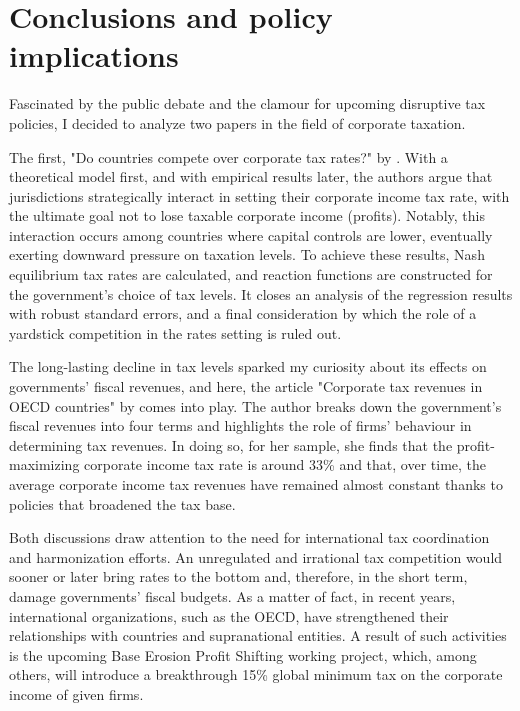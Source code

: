 \chapter{Conclusions and policy implications}

Fascinated by the public debate and the clamour for upcoming disruptive tax policies, I decided to analyze two papers in the field of corporate taxation.

The first, "Do countries compete over corporate tax rates?" by \textcite{dev-loc-red-08}. With a theoretical model first, and with empirical results later, the authors argue that jurisdictions strategically interact in setting their corporate income tax rate, with the ultimate goal not to lose taxable corporate income (profits). Notably, this interaction occurs among countries where capital controls are lower, eventually exerting downward pressure on taxation levels. To achieve these results, Nash equilibrium tax rates are calculated, and reaction functions are constructed for the government's choice of tax levels. It closes an analysis of the regression results with robust standard errors, and a final consideration by which the role of a yardstick competition in the rates setting is ruled out. 

The long-lasting decline in tax levels sparked my curiosity about its effects on governments' fiscal revenues, and here, the article "Corporate tax revenues in OECD countries" by \textcite{clausing} comes into play. The author breaks down the government's fiscal revenues into four terms and highlights the role of firms' behaviour in determining tax revenues. In doing so, for her sample, she finds that the profit-maximizing corporate income tax rate is around 33\% and that, over time, the average corporate income tax revenues have remained almost constant thanks to policies that broadened the tax base.

Both discussions draw attention to the need for international tax coordination and harmonization efforts. An unregulated and irrational tax competition would sooner or later bring rates to the bottom and, therefore, in the short term, damage governments' fiscal budgets. As a matter of fact, in recent years, international organizations, such as the OECD, have strengthened their relationships with countries and supranational entities. A result of such activities is the upcoming Base Erosion Profit Shifting working project, which, among others, will introduce a breakthrough 15\% global minimum tax on the corporate income of given firms.